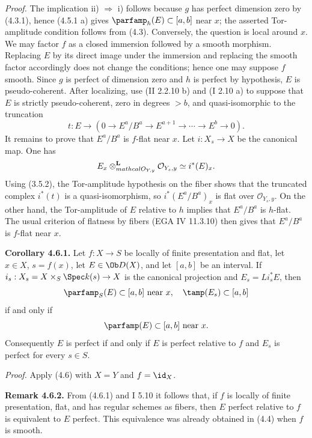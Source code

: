 \emph{Proof.} The implication ii) \(\Rightarrow\) i) follows because \(g\) has perfect dimension zero by (4.3.1), hence (4.5.1 a) gives \(\parfamp_h(E)\subset[a,b]\) near \(x\); the asserted Tor-amplitude condition follows from (4.3). Conversely, the question is local around \(x\). We may factor \(f\) as a closed immersion followed by a smooth morphism. Replacing \(E\) by its direct image under the immersion and replacing the smooth factor accordingly does not change the conditions; hence one may suppose \(f\) smooth. Since \(g\) is perfect of dimension zero and \(h\) is perfect by hypothesis, \(E\) is pseudo-coherent. After localizing, use (II 2.2.10 b) and (I 2.10 a) to suppose that \(E\) is strictly pseudo-coherent, zero in degrees \(>b\), and quasi-isomorphic to the truncation
\[
 t:
 E\longrightarrow
 (0\to E^a/B^a\to E^{a+1}\to\cdots\to E^b\to0).
\]
It remains to prove that \(E^a/B^a\) is \(f\)-flat near \(x\). Let \(i:X_s\to X\) be the canonical map. One has
\[
 E_x\otimes_{\\mathcal O_{Y,y}}^{\mathbf L}\mathcal O_{Y_s,y}
 \simeq i^*(E)_x.
\]
Using (3.5.2), the Tor-amplitude hypothesis on the fiber shows that the truncated complex \(i^*(t)\) is a quasi-isomorphism, so \(i^*(E^a/B^a)_x\) is flat over \(\mathcal O_{Y_s,y}\). On the other hand, the Tor-amplitude of \(E\) relative to \(h\) implies that \(E^a/B^a\) is \(h\)-flat. The usual criterion of flatness by fibers (EGA IV 11.3.10) then gives that \(E^a/B^a\) is \(f\)-flat near \(x\).

\textbf{Corollary 4.6.1.} Let \(f:X\to S\) be locally of finite presentation and flat, let \(x\in X\), \(s=f(x)\), let \(E\in\Ob D(X)\), and let \([a,b]\) be an interval. If \(i_s:X_s=X\times_S\Spec k(s)\to X\) is the canonical projection and \(E_s=Li_s^*E\), then
\[
 \parfamp_S(E)
  \subset[a,b]\text{ near }x,
 \quad
 \tamp(E_s)
  \subset[a,b]
\]
if and only if
\[
 \parfamp(E)
  \subset[a,b]\text{ near }x.
\]
Consequently \(E\) is perfect if and only if \(E\) is perfect relative to \(f\) and \(E_s\) is perfect for every \(s\in S\).

\emph{Proof.} Apply (4.6) with \(X=Y\) and \(f=\id_X\).

\textbf{Remark 4.6.2.} From (4.6.1) and I 5.10 it follows that, if \(f\) is locally of finite presentation, flat, and has regular schemes as fibers, then \(E\) perfect relative to \(f\) is equivalent to \(E\) perfect. This equivalence was already obtained in (4.4) when \(f\) is smooth.


